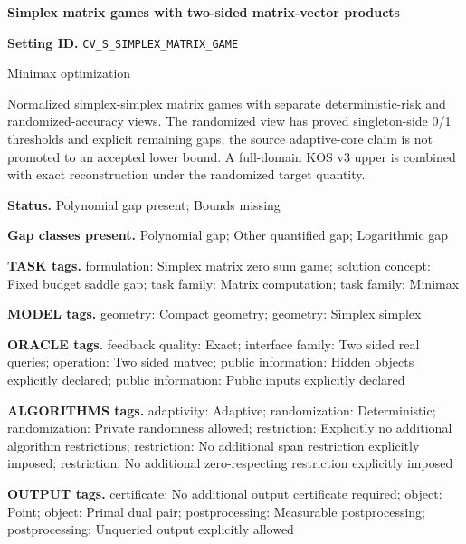 \documentclass[10pt,a4paper]{article}
\begin{document}
\raggedright

{\LARGE\bfseries\sffamily\color{AtlasNavy} Simplex matrix games with two-sided matrix-vector products\par}\vspace{5pt}


\textbf{Setting ID.} \texttt{CV\_\allowbreak{}S\_\allowbreak{}SIMPLEX\_\allowbreak{}MATRIX\_\allowbreak{}GAME}



Minimax optimization



Normalized simplex-simplex matrix games with separate deterministic-risk and randomized-accuracy views. The randomized view has proved singleton-side 0/1 thresholds and explicit remaining gaps; the source adaptive-core claim is not promoted to an accepted lower bound. A full-domain KOS v3 upper is combined with exact reconstruction under the randomized target quantity.



\textbf{Status.} Polynomial gap present; Bounds missing



\textbf{Gap classes present.} Polynomial gap; Other quantified gap; Logarithmic gap



\textbf{TASK tags.} formulation: Simplex matrix zero sum game; solution concept: Fixed budget saddle gap; task family: Matrix computation; task family: Minimax



\textbf{MODEL tags.} geometry: Compact geometry; geometry: Simplex simplex



\textbf{ORACLE tags.} feedback quality: Exact; interface family: Two sided real queries; operation: Two sided matvec; public information: Hidden objects explicitly declared; public information: Public inputs explicitly declared



\textbf{ALGORITHMS tags.} adaptivity: Adaptive; randomization: Deterministic; randomization: Private randomness allowed; restriction: Explicitly no additional algorithm restrictions; restriction: No additional span restriction explicitly imposed; restriction: No additional zero-respecting restriction explicitly imposed



\textbf{OUTPUT tags.} certificate: No additional output certificate required; object: Point; object: Primal dual pair; postprocessing: Measurable postprocessing; postprocessing: Unqueried output explicitly allowed
\end{document}
